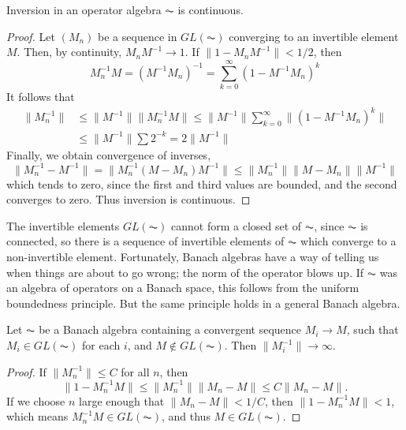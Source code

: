 \begin{lemma}
    Inversion in an operator algebra $\AC$ is continuous.
\end{lemma}
\begin{proof}
    Let $(M_n)$ be a sequence in $GL(\AC)$ converging to an invertible element $M$. Then, by continuity, $M_nM^{-1} \to 1$. If $\| 1 - M_n M^{-1} \| < 1/2$, then
    \[ M_n^{-1} M = (M^{-1}M_n)^{-1} = \sum_{k = 0}^\infty (1 - M^{-1}M_n)^k \]
    It follows that
    \begin{align*}
        \| M_n^{-1} \| &\leq \| M^{-1} \| \| M_n^{-1} M \| \leq \| M^{-1} \| \sum_{k = 0}^\infty \| (1 - M^{-1} M_n)^k \|\\
        &\leq \| M^{-1} \| \sum 2^{-k} = 2 \| M^{-1} \|
    \end{align*}
    Finally, we obtain convergence of inverses,
    \[ \| M_n^{-1} - M^{-1} \| = \| M_n^{-1} (M - M_n) M^{-1} \| \leq \| M_n^{-1} \| \| M - M_n \| \| M^{-1} \| \]
    which tends to zero, since the first and third values are bounded, and the second converges to zero. Thus inversion is continuous.
\end{proof}

The invertible elements $GL(\AC)$ cannot form a closed set of $\AC$, since $\AC$ is connected, so there is a sequence of invertible elements of $\AC$ which converge to a non-invertible element. Fortunately, Banach algebras have a way of telling us when things are about to go wrong; the norm of the operator blows up. If $\AC$ was an algebra of operators on a Banach space, this follows from the uniform boundedness principle. But the same principle holds in a general Banach algebra.

\begin{lemma}
    Let $\AC$ be a Banach algebra containing a convergent sequence $M_i \to M$, such that $M_i \in GL(\AC)$ for each $i$, and $M \not \in GL(\AC)$. Then $\| M_i^{-1} \| \to \infty$.
\end{lemma}
\begin{proof}
    If $\| M_n^{-1} \| \leq C$ for all $n$, then
    \[ \| 1 - M_n^{-1} M \| \leq \| M_n^{-1} \| \| M_n - M \| \leq C \| M_n - M \|. \]
    If we choose $n$ large enough that $\| M_n - M \| < 1/C$, then $\| 1 - M_n^{-1} M \| < 1$, which means $M_n^{-1} M \in GL(\AC)$, and thus $M \in GL(\AC)$.
\end{proof}

